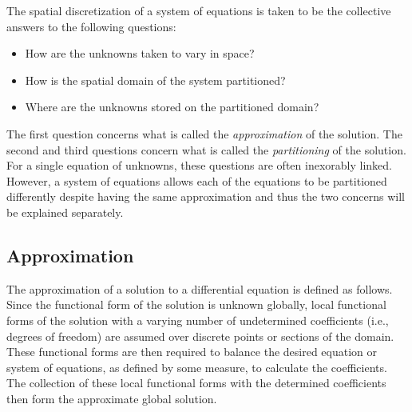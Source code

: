 \documentclass[12pt]{../UWMadThesis}
\begin{document}
The spatial discretization of a system of equations is taken to be the collective answers to the following questions:
\begin{itemize}[topsep=-0.40\parskip]
	\item{How are the unknowns taken to vary in space?}
    \item{How is the spatial domain of the system partitioned?}
    \item{Where are the unknowns stored on the partitioned domain?}
\end{itemize}
The first  question concerns what is called the \emph{approximation} of the solution.
The second and third questions concern what is called the \emph{partitioning} of the solution.
For a single equation of unknowns, these questions are often inexorably linked.
However, a system of equations allows each of the equations to be partitioned differently despite having the same approximation and thus the two concerns will be explained separately.


\subsection{Approximation}

The approximation of a solution to a differential equation is defined as follows.
Since the functional form of the solution is unknown globally, local functional forms of the solution with a varying number of undetermined coefficients (i.e., degrees of freedom) are assumed over discrete points or sections of the domain.
These functional forms are then required to balance the desired equation or system of equations, as defined by some measure, to calculate the coefficients.
The collection of these local functional forms with the determined coefficients then form the approximate global solution.
\end{document}
